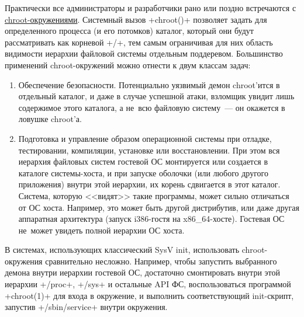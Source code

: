 \documentclass[10pt,oneside,a4paper]{article}
\begin{document}
Практически все администраторы и разработчики рано или поздно встречаются с
\href{http://linux.die.net/man/1/chroot}{chroot-окружениями}. Системный вызов
+chroot()+ позволяет задать для определенного процесса (и его потомков) каталог,
который они будут рассматривать как корневой +/+, тем самым ограничивая для них
область видимости иерархии файловой системы отдельным поддеревом. Большинство
применений chroot-окружений можно отнести к двум классам задач:
\begin{enumerate}
	\item Обеспечение безопасности. Потенциально уязвимый демон chroot'ится
		в отдельный каталог, и даже в случае успешной атаки, взломщик
		увидит лишь содержимое этого каталога, а не~всю файловую
		систему~--- он окажется в ловушке chroot'а.
	\item Подготовка и управление образом операционной системы при отладке,
		тестировании, компиляции, установке или восстановлении. При этом
		вся иерархия файловых систем гостевой ОС монтируется или
		создается в каталоге системы-хоста, и при запуске оболочки (или
		любого другого приложения) внутри этой иерархии, их корень
		сдвигается в этот каталог. Система, которую <<видят>> такие
		программы, может сильно отличаться от ОС хоста. Например, это
		может быть другой дистрибутив, или даже другая аппаратная
		архитектура (запуск i386-гостя на x86\_64-хосте). Гостевая ОС
		не~может увидеть полной иерархии ОС хоста.
\end{enumerate}

В системах, использующих классический SysV init, использовать chroot-окружения
сравнительно несложно. Например, чтобы запустить выбранного демона внутри
иерархии гостевой ОС, достаточно смонтировать внутри этой иерархии +/proc+,
+/sys+ и остальные API ФС, воспользоваться программой +chroot(1)+ для входа в
окружение, и выполнить соответствующий init-скрипт, запустив +/sbin/service+
внутри окружения.
\end{document}
